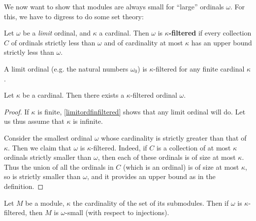 We now want to show that modules are always small for ``large'' ordinals
$\omega$.
For this, we have to digress to do some set theory:

\begin{definition} 
Let $\omega$ be a \emph{limit} ordinal, and $\kappa$ a cardinal. Then $\omega$ is
\textbf{$\kappa$-filtered} if every collection $C$ of ordinals strictly less
than $\omega$ and of cardinality at most $\kappa$ has an upper bound strictly
less than $\omega$.
\end{definition} 

\begin{example} \label{limitordfinfiltered}
A limit ordinal (e.g. the natural numbers $\omega_0$) is $\kappa$-filtered for any finite cardinal $\kappa$.
\end{example} 


\begin{proposition} 
Let $\kappa$ be a cardinal. Then there exists a $\kappa$-filtered ordinal
$\omega$.
\end{proposition} 
\begin{proof} 
If $\kappa$ is finite, \cref{limitordfinfiltered} shows that any limit ordinal
will do.  Let us thus assume that $\kappa$ is infinite.

Consider the smallest ordinal $\omega$ whose cardinality is strictly greater
than that of $\kappa$. Then we claim that $\omega$ is $\kappa$-filtered.
Indeed, if $C$ is a collection of at most $\kappa$ ordinals strictly smaller
than $\omega$, then each of these ordinals is of size at most $\kappa$. Thus
the union of all the ordinals in $C$ (which is an ordinal) is of size at most
$\kappa$, so is strictly smaller than $\omega$, and it provides an upper bound as in the definition.
\end{proof} 


\begin{proposition} \label{modulesaresmall}
Let $M$ be a module, $\kappa$ the cardinality of the set of its submodules.
Then if $\omega$ is $\kappa$-filtered, then $M$ is $\omega$-small (with
respect to injections).
\end{proposition} 

